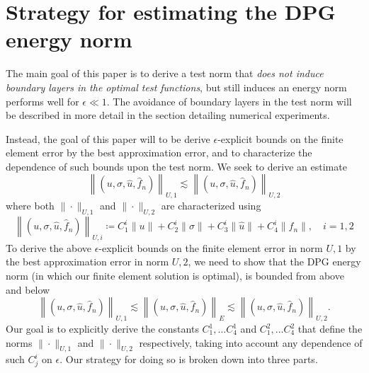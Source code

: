 \documentclass[11pt,onecolumn]{scrartcl}
\begin{document}
\section{Strategy for estimating the DPG energy norm}

The main goal of this paper is to derive a test norm that \textit{does not induce boundary layers in the optimal test functions}, but still induces an energy norm performs well for $\epsilon \ll 1$.  
The avoidance of boundary layers in the test norm will be described in more detail in the section detailing numerical experiments. 

Instead, the goal of this paper will to be derive $\epsilon$-explicit bounds on the finite element error by the best approximation error, and to characterize the dependence of such bounds upon the test norm.  We seek to derive an estimate
\[
\left\| \left(u,\sigma,\widehat{u},\widehat{f}_n\right)\right \|_{U,1} \lesssim \left\| \left(u,\sigma,\widehat{u},\widehat{f}_n\right)\right \|_{U,2}
\]
where both $\|\cdot\|_{U,1}$ and $\|\cdot\|_{U,2}$ are characterized using
\[
\left\| \left(u,\sigma,\widehat{u},\widehat{f}_n\right)\right \|_{U,i} \coloneqq C_1^i\|u\| + C_2^i\|\sigma\| + C_3^i\|\widehat{u}\| + C_4^i\|\widehat{f}_n\|,\quad i = 1,2
\]
To derive the above $\epsilon$-explicit bounds on the finite element error in norm $U,1$ by the best approximation error in norm $U,2$, we need to show that the DPG energy norm (in which our finite element solution is optimal), is bounded from above and below 
\[
\left\| \left(u,\sigma,\widehat{u},\widehat{f}_n\right)\right \|_{U,1} \lesssim  \left\| \left(u,\sigma,\widehat{u},\widehat{f}_n\right)\right \|_E \lesssim \left\| \left(u,\sigma,\widehat{u},\widehat{f}_n\right)\right \|_{U,2}.
\]
Our goal is to explicitly derive the constants $C^1_1,\ldots C^1_4$ and $C^2_1,\ldots C^2_4$ that define the norms $\|\cdot\|_{U,1}$ and $\|\cdot\|_{U,2}$ respectively, taking into account any dependence of such $C^i_j$ on $\epsilon$.  Our strategy for doing so is broken down into three parts.  
\end{document}
